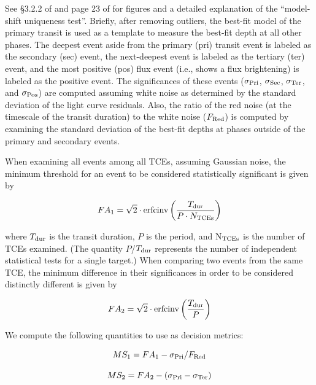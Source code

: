 See \S3.2.2 of \citet{Rowe2015a} and page 23 of \citet{Coughlin2017b} for figures and a detailed explanation of the ``model-shift uniqueness test''. Briefly, after removing outliers, the best-fit model of the primary transit is used as a template to measure the best-fit depth at all other phases. The deepest event aside from the primary (pri) transit event is labeled as the secondary (sec) event, the next-deepest event is labeled as the tertiary (ter) event, and the most positive (pos) flux event (i.e., shows a flux brightening) is labeled as the positive event. The significances of these events ($\sigma_{\rm Pri}$, $\sigma_{\rm Sec}$, $\sigma_{\rm Ter}$, and $\sigma_{\rm Pos}$) are computed assuming white noise as determined by the standard deviation of the light curve residuals. Also, the ratio of the red noise (at the timescale of the transit duration) to the white noise ($F_{\rm Red}$) is computed by examining the standard deviation of the best-fit depths at phases outside of the primary and secondary events.  

When examining all events among all TCEs, assuming Gaussian noise, the minimum threshold for an event to be considered statistically significant is given by

\begin{equation}
    FA_{1} = \sqrt{2}\cdot \textrm{erfcinv}\left(\frac{T_{\rm dur}}{P \cdot N_{\rm TCEs}}\right)
\end{equation}

\noindent where $T_{\rm dur}$ is the transit duration, $P$ is the period, and N$_{\rm TCEs}$ is the number of TCEs examined. (The quantity $P$/$T_{\rm dur}$ represents the number of independent statistical tests for a single target.) When comparing two events from the same TCE, the minimum difference in their significances in order to be considered distinctly different is given by

\begin{equation}
    FA_{2} = \sqrt{2}\cdot \textrm{erfcinv}\left(\frac{T_{\rm dur}}{P}\right)
\end{equation}

\noindent We compute the following quantities to use as decision metrics:

\begin{equation}
    MS_{1} = FA_{1} - \sigma_{\rm Pri}/F_{\rm Red}
\end{equation}

\begin{equation}
    MS_{2} = FA_{2} - (\sigma_{\rm Pri} - \sigma_{\rm Ter})
\end{equation}

